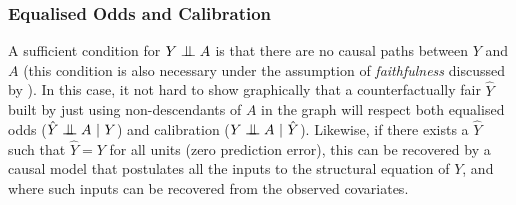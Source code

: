 \documentclass{article}
\newcommand{\cind}[0]{\mathrel{\text{\scalebox{1.07}{$\perp\mkern-10mu\perp$}}}}
\begin{document}

\subsubsection{Equalised Odds and Calibration}
A sufficient condition for $Y \cind A$ is that there are no causal paths
between $Y$ and $A$ (this condition is also necessary under the
assumption of \emph{faithfulness} discussed by \cite{sgs:93}). In
this case, it not hard to show graphically that a counterfactually
fair $\hat Y$ built by just using non-descendants of $A$ in the
graph will respect both equalised
odds ($\hat Y \cind A\ |\ Y$) and calibration ($Y \cind A\ |\ \hat Y$). Likewise, if there exists a $\hat Y$ such that $\hat Y = Y$
for all units (zero prediction error), this can be recovered by a
causal model that postulates all the inputs to the structural
equation of $Y$, and where such inputs can be recovered from the
observed covariates.
\end{document}
